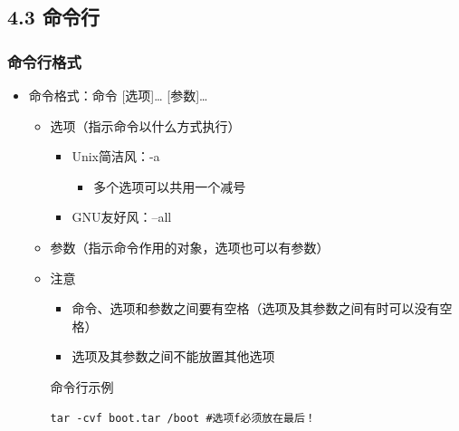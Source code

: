 \documentclass[xcolor=svgnames,presentation]{beamer}
\begin{document}
\subsection{4.3 命令行}
\label{sec-4-3}
\begin{frame}[fragile]
\frametitle{命令行格式}
\label{sec-4-3-1}
\begin{itemize}

\item 命令格式：命令 [选项]\ldots{} [参数]\ldots{}
\label{sec-4-3-1-1}%
\begin{itemize}

\item 选项（指示命令以什么方式执行）
\label{sec-4-3-1-1-1}%
\begin{itemize}

\item Unix简洁风：-a
\label{sec-4-3-1-1-1-1}%
\begin{itemize}

\item 多个选项可以共用一个减号
\label{sec-4-3-1-1-1-1-1}%
\end{itemize} %

\item GNU友好风：--all
\label{sec-4-3-1-1-1-2}%
\end{itemize} %

\item 参数（指示命令作用的对象，选项也可以有参数）
\label{sec-4-3-1-1-2}%

\item 注意
\label{sec-4-3-1-1-3}%
\begin{itemize}

\item 命令、选项和参数之间要有空格（选项及其参数之间有时可以没有空格）
\label{sec-4-3-1-1-3-1}%

\item 选项及其参数之间不能放置其他选项
\label{sec-4-3-1-1-3-2}%
\end{itemize} %
\begin{exampleblock}{命令行示例}
\label{sec-4-3-1-1-3-3}


\begin{verbatim}
tar -cvf boot.tar /boot #选项f必须放在最后！
\end{verbatim}
\end{exampleblock}
\end{itemize} %
\end{itemize} %
\end{frame}
\end{document}
